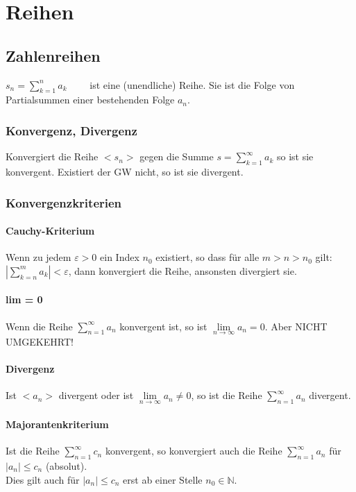 \section{Reihen}

\subsection{Zahlenreihen}
$ s_n = \sum\limits_{k=1}^{n} a_k \qquad $ ist eine (unendliche) Reihe. Sie ist die Folge von Partialsummen einer bestehenden Folge $a_n$.

\subsubsection{Konvergenz, Divergenz}
Konvergiert die Reihe $< s_n >$ gegen die Summe $ s = \sum\limits_{k=1}^{\infty} a_k $ so ist sie konvergent. 
Existiert der GW nicht, so ist sie divergent.

\subsubsection{Konvergenzkriterien}

\paragraph{Cauchy-Kriterium} 
Wenn zu jedem $\varepsilon > 0$ ein Index $n_0$ existiert, so dass für alle $m > n > n_0$ gilt: \\
$\left| \sum\limits_{k=n}^m a_k \right| < \varepsilon$, dann konvergiert die Reihe, ansonsten divergiert sie.

\paragraph{lim = 0}
Wenn die Reihe $ \sum\limits_{n=1}^{\infty} a_n $ konvergent ist, so ist $\lim\limits_{n \to \infty} a_n = 0$. \hspace{2cm} Aber NICHT UMGEKEHRT!

\paragraph{Divergenz}
Ist $<a_n>$ divergent oder ist $\lim\limits_{n \to \infty} a_n \neq 0$, so ist die Reihe $ \sum\limits_{n=1}^{\infty} a_n $ divergent.

\paragraph{Majorantenkriterium}
Ist die Reihe $ \sum\limits_{n=1}^{\infty} c_n $ konvergent, so konvergiert auch die Reihe $ \sum\limits_{n=1}^{\infty} a_n $ für $|a_n| \leq c_n$ (absolut). \\
Dies gilt auch für $|a_n| \leq c_n$ erst ab einer Stelle $n_0 \in \mathbb{N}$.

